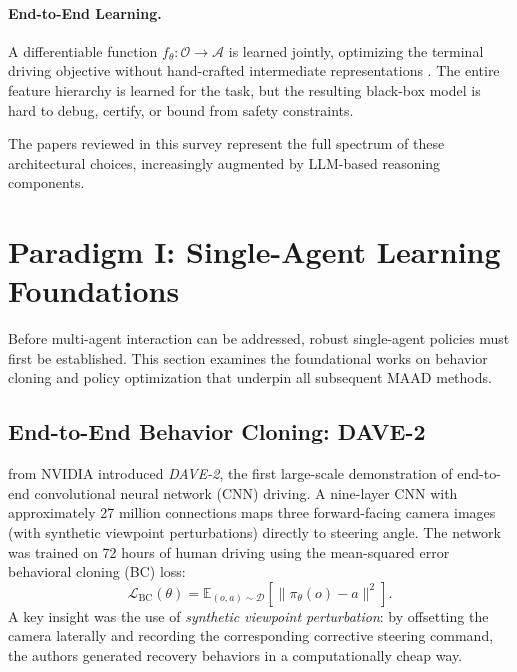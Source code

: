 \documentclass[12pt, a4paper]{article}
\begin{document}
\paragraph{End-to-End Learning.}
A differentiable function $f_\theta: \mathcal{O} \to \mathcal{A}$ is learned
jointly, optimizing the terminal driving objective without hand-crafted intermediate
representations \citep{bojarski2016end}. The entire feature hierarchy is learned
for the task, but the resulting black-box model is hard to debug, certify, or
bound from safety constraints.

The papers reviewed in this survey represent the full spectrum of these
architectural choices, increasingly augmented by LLM-based reasoning components.

\section{Paradigm I: Single-Agent Learning Foundations}
\label{sec:single}

Before multi-agent interaction can be addressed, robust single-agent policies must
first be established. This section examines the foundational works on behavior
cloning and policy optimization that underpin all subsequent MAAD methods.

\subsection{End-to-End Behavior Cloning: DAVE-2}
\label{sec:dave}

\citet{bojarski2016end} from NVIDIA introduced \emph{DAVE-2}, the first large-scale
demonstration of end-to-end convolutional neural network (CNN) driving. A
nine-layer CNN with approximately 27 million connections maps three forward-facing
camera images (with synthetic viewpoint perturbations) directly to steering angle.
The network was trained on 72 hours of human driving using the mean-squared error
behavioral cloning (BC) loss:
\begin{equation}
  \mathcal{L}_{\text{BC}}(\theta) =
    \mathbb{E}_{(o, a) \sim \mathcal{D}}\!\left[ \|\pi_\theta(o) - a \|^2 \right].
  \label{eq:bc}
\end{equation}
A key insight was the use of \emph{synthetic viewpoint perturbation}: by
offsetting the camera laterally and recording the corresponding corrective steering
command, the authors generated recovery behaviors in a computationally cheap way.
\end{document}
